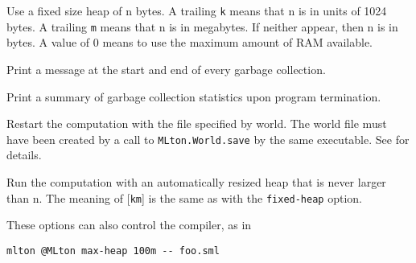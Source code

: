 \begin{description}
 Use a fixed size heap of n bytes.
 A trailing {\tt k} means that n is in units of 1024 bytes. 
 A trailing {\tt m} means that n is in megabytes. 
 If neither appear, then n is in bytes.
 A value of 0 means to use the maximum amount of RAM available.

Print a message at the start and end of every garbage collection.

Print a summary of garbage collection statistics upon program
termination.

Restart the computation with the file specified by world.
The world file must have been created by a call to
{\tt MLton.World.save} by the same executable.  See 
for details.

Run the computation with an automatically resized heap that is never
larger than n.  The meaning of [{\tt km}] is the same as with the
{\tt fixed-heap} option.

\end{description}
These options can also control the compiler, as in
\begin{verbatim}
mlton @MLton max-heap 100m -- foo.sml
\end{verbatim}
